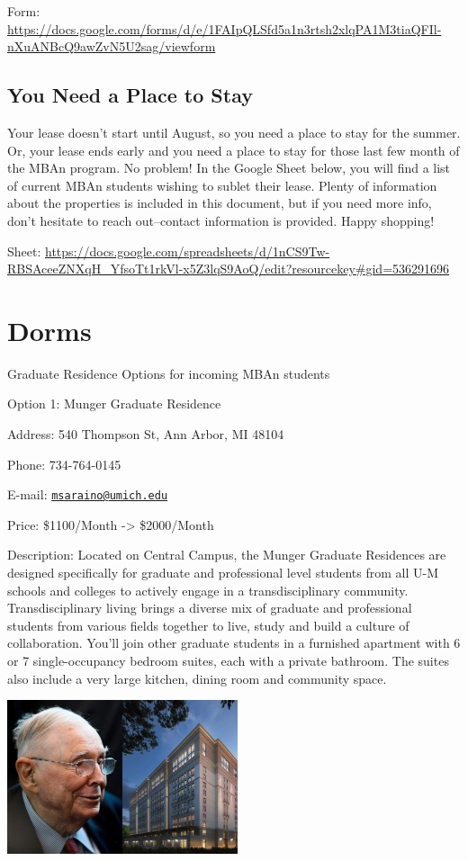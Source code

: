 \documentclass[
]{book}
\begin{document}
Form: \url{https://docs.google.com/forms/d/e/1FAIpQLSfd5a1n3rtsh2xlqPA1M3tiaQFIl-nXuANBcQ9awZvN5U2sag/viewform}

\hypertarget{you-need-a-place-to-stay}{%
\subsection{You Need a Place to Stay}\label{you-need-a-place-to-stay}}

Your lease doesn't start until August, so you need a place to stay for the summer. Or, your lease ends early and you need a place to stay for those last few month of the MBAn program. No problem! In the Google Sheet below, you will find a list of current MBAn students wishing to sublet their lease. Plenty of information about the properties is included in this document, but if you need more info, don't hesitate to reach out--contact information is provided. Happy shopping!

Sheet: \url{https://docs.google.com/spreadsheets/d/1nCS9Tw-RBSAceeZNXqH_YfsoTt1rkVl-x5Z3lqS9AoQ/edit?resourcekey\#gid=536291696}

\hypertarget{dorms}{%
\section{Dorms}\label{dorms}}

Graduate Residence Options for incoming MBAn students

Option 1: Munger Graduate Residence

Address: 540 Thompson St, Ann Arbor, MI 48104

Phone: 734-764-0145

E-mail: \href{mailto:msaraino@umich.edu}{\nolinkurl{msaraino@umich.edu}}

Price: \$1100/Month -\textgreater{} \$2000/Month

Description:
Located on Central Campus, the Munger Graduate Residences are designed specifically for graduate and professional level students from all U-M schools and colleges to actively engage in a transdisciplinary community. Transdisciplinary living brings a diverse mix of graduate and professional students from various fields together to live, study and build a culture of collaboration. You'll join other graduate students in a furnished apartment with 6 or 7 single-occupancy bedroom suites, each with a private bathroom. The suites also include a very large kitchen, dining room and community space.

\includegraphics[width=2.66667in,height=\textheight]{MUNGER1.jpg}
\end{document}
